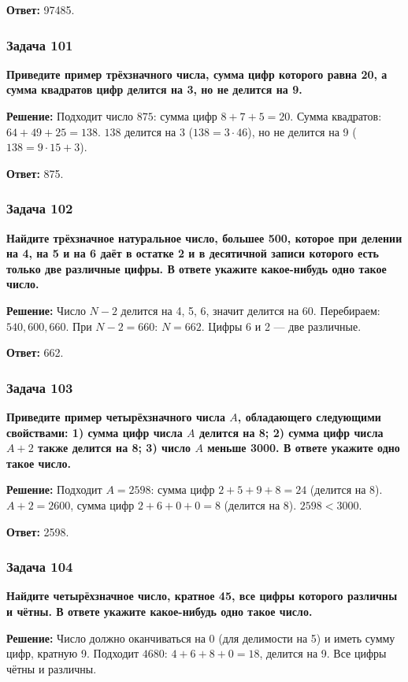 \documentclass[12pt, a4paper]{article}
\begin{document}
\textbf{Ответ:} 97485.

\subsubsection*{Задача 101}
\textbf{Приведите пример трёхзначного числа, сумма цифр которого равна 20, а сумма квадратов цифр делится на 3, но не делится на 9.}

\textbf{Решение:}
Подходит число $875$: сумма цифр $8+7+5=20$. Сумма квадратов: $64+49+25=138$. $138$ делится на 3 ($138=3 \cdot 46$), но не делится на 9 ($138=9 \cdot 15 + 3$).

\textbf{Ответ:} 875.

\subsubsection*{Задача 102}
\textbf{Найдите трёхзначное натуральное число, большее 500, которое при делении на 4, на 5 и на 6 даёт в остатке 2 и в десятичной записи которого есть только две различные цифры. В ответе укажите какое-нибудь одно такое число.}

\textbf{Решение:}
Число $N-2$ делится на 4, 5, 6, значит делится на 60. Перебираем: $540, 600, 660$. При $N-2 = 660$: $N = 662$. Цифры 6 и 2 — две различные.

\textbf{Ответ:} 662.

\subsubsection*{Задача 103}
\textbf{Приведите пример четырёхзначного числа $A$, обладающего следующими свойствами: 1) сумма цифр числа $A$ делится на 8; 2) сумма цифр числа $A+2$ также делится на 8; 3) число $A$ меньше 3000. В ответе укажите одно такое число.}

\textbf{Решение:}
Подходит $A = 2598$: сумма цифр $2+5+9+8=24$ (делится на 8). $A+2 = 2600$, сумма цифр $2+6+0+0=8$ (делится на 8). $2598 < 3000$.

\textbf{Ответ:} 2598.

\subsubsection*{Задача 104}
\textbf{Найдите четырёхзначное число, кратное 45, все цифры которого различны и чётны. В ответе укажите какое-нибудь одно такое число.}

\textbf{Решение:}
Число должно оканчиваться на 0 (для делимости на 5) и иметь сумму цифр, кратную 9. Подходит $4680$: $4+6+8+0=18$, делится на 9. Все цифры чётны и различны.
\end{document}
